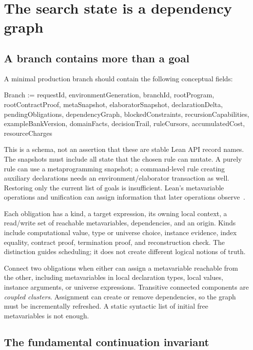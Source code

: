 \section{The search state is a dependency graph}\label{sec:state}

\subsection{A branch contains more than a goal}

A minimal production branch should contain the following conceptual fields:
\begin{Code}
Branch := {
  requestId, environmentGeneration, branchId,
  rootProgram, rootContractProof,
  metaSnapshot, elaboratorSnapshot, declarationDelta,
  pendingObligations, dependencyGraph, blockedConstraints,
  recursionCapabilities, exampleBankVersion,
  domainFacts, decisionTrail, ruleCursors,
  accumulatedCost, resourceCharges
}
\end{Code}
This is a schema, not an assertion that these are stable Lean API record names.
The snapshots must include all state that the chosen rule can mutate. A purely
\MetaM{} rule can use a metaprogramming snapshot; a command-level rule creating
auxiliary declarations needs an environment/elaborator transaction as well.
Restoring only the current list of goals is insufficient. Lean's metavariable
operations and unification can assign information that later operations
observe~\cite{meta-book,lean-apply}.

Each obligation has a kind, a target expression, its owning local context, a
read/write set of reachable metavariables, dependencies, and an origin. Kinds
include computational value, type or universe choice, instance evidence,
index equality, contract proof, termination proof, and reconstruction check.
The distinction guides scheduling; it does not create different logical
notions of truth.

Connect two obligations when either can assign a metavariable reachable from
the other, including metavariables in local declaration types, local values,
instance arguments, or universe expressions. Transitive connected components
are \emph{coupled clusters}. Assignment can create or remove dependencies, so
the graph must be incrementally refreshed. A static syntactic list of initial
free metavariables is not enough.

\subsection{The fundamental continuation invariant}

